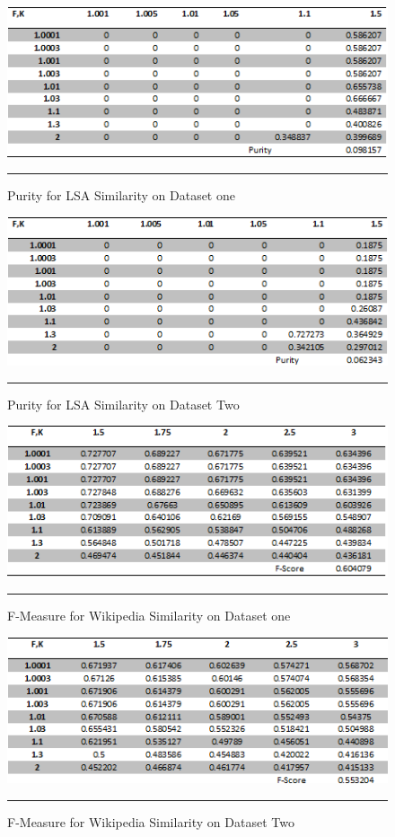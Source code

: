 \begin{figure}[htbp]
	\centering
		\includegraphics{./Figures/lsa_Purity_DS1.png}
		\rule{35em}{0.5pt}
	\caption[Purity for LSA Similarity on Dataset one]{Purity for LSA Similarity on Dataset one}
	\label{fig:F2}
\end{figure}

\begin{figure}[htbp]
	\centering
		\includegraphics{./Figures/lsa_Purity_DS2.png}
		\rule{35em}{0.5pt}
	\caption[Purity for LSA Similarity on Dataset Two]{Purity for LSA Similarity on Dataset Two}
	\label{fig:F3}
\end{figure}

\begin{figure}[htbp]
	\centering
		\includegraphics{./Figures/wiki_F_DS1.png}
		\rule{35em}{0.5pt}
	\caption[F-Measure for Wikipedia Similarity on Dataset one]{F-Measure for Wikipedia Similarity on Dataset one}
	\label{fig:F2}
\end{figure}

\begin{figure}[htbp]
	\centering
		\includegraphics{./Figures/wiki_F_DS2.png}
		\rule{35em}{0.5pt}
	\caption[F-Measure for Wikipedia Similarity on Dataset Two]{F-Measure for Wikipedia Similarity on Dataset Two}
	\label{fig:F3}
\end{figure}


